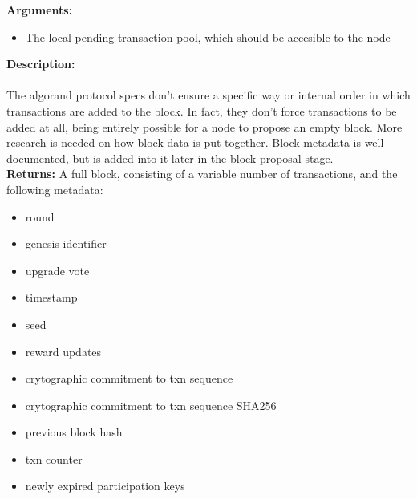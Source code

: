 \documentclass[10pt,a4paper]{article}
\begin{document}
\noindent \textbf{Arguments:}
\begin{itemize}
    \item The local pending transaction pool, which should be accesible to the node\\
  \end{itemize}

\noindent \textbf{Description:}\\
\\
The algorand protocol specs don't ensure a specific way or internal order in which transactions are added to the block.
In fact, they don't force transactions to be added at all, being entirely possible for a node to propose an empty block.
More research is needed on how block data is put together.
Block metadata is well documented, but is added into it later in the block proposal stage.\\

\noindent \textbf{Returns:} A full block, consisting of a variable number of transactions, and the following metadata:
\begin{itemize}
    \item round
    \item genesis identifier
    \item upgrade vote
    \item timestamp
    \item seed
    \item reward updates
    \item crytographic commitment to txn sequence
    \item crytographic commitment to txn sequence SHA256
    \item previous block hash
    \item txn counter
    \item newly expired participation keys
  \end{itemize}
\end{document}
